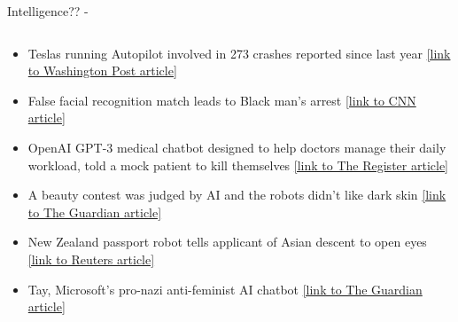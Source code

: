 \begin{frame}[t,allowframebreaks]{Intelligence?? -}
\begin{columns}
\begin{column}{0.70\textwidth}
            \begin{itemize}
                \item 
                Teslas running Autopilot involved in 273 crashes reported since last year
                \href{https://www.washingtonpost.com/technology/2022/06/15/tesla-autopilot-crashes/}
                {\small [link to Washington Post article]}
                \item 
                False facial recognition match leads to Black man’s arrest
                \href{https://edition.cnn.com/2021/04/29/tech/nijeer-parks-facial-recognition-police-arrest/index.html}
                {\small [link to CNN article]}
                \item 
                OpenAI GPT-3 medical chatbot designed to help doctors manage 
                their daily workload, told a mock patient to kill themselves
                \href{https://www.theregister.com/2020/10/28/gpt3_medical_chatbot_experiment/}
                {\small [link to The Register article]}
                \item 
                A beauty contest was judged by AI and the robots didn't like dark skin
                \href{https://www.theguardian.com/technology/2016/sep/08/artificial-intelligence-beauty-contest-doesnt-like-black-people}
                {\small [link to The Guardian article]}
                \item 
                New Zealand passport robot tells applicant of Asian descent to open eyes
                \href{https://www.reuters.com/article/us-newzealand-passport-error-idUSKBN13W0RL}
                {\small [link to Reuters article]}
                \item 
                Tay, Microsoft's pro-nazi anti-feminist AI chatbot
                \href{https://www.theguardian.com/technology/2016/mar/24/tay-microsofts-ai-chatbot-gets-a-crash-course-in-racism-from-twitter}
                {\small [link to The Guardian article]}
            \end{itemize}

        \end{column}
    \end{columns}
        
\end{frame}